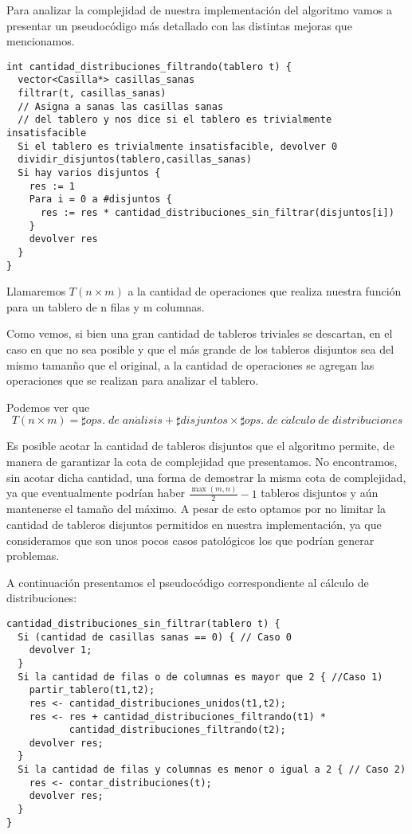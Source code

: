 \documentclass[a4paper, 12pt] {article}
\begin{document}
Para analizar la complejidad de nuestra implementaci\'on del algoritmo vamos a presentar un pseudoc\'odigo m\'as detallado con las distintas mejoras que mencionamos.


\begin{verbatim}
int cantidad_distribuciones_filtrando(tablero t) {
  vector<Casilla*> casillas_sanas
  filtrar(t, casillas_sanas)  
  // Asigna a sanas las casillas sanas 
  // del tablero y nos dice si el tablero es trivialmente insatisfacible
  Si el tablero es trivialmente insatisfacible, devolver 0
  dividir_disjuntos(tablero,casillas_sanas)
  Si hay varios disjuntos {
    res := 1
    Para i = 0 a #disjuntos {
      res := res * cantidad_distribuciones_sin_filtrar(disjuntos[i])
    }
    devolver res
  }
}
\end{verbatim}


Llamaremos $T\left( n \times m\right) $ a la cantidad de operaciones que realiza nuestra funci\'on para un tablero de n filas y m columnas.


Como vemos, si bien una gran cantidad de tableros triviales se descartan, en el caso en que no sea posible y que el m\'as grande de los tableros disjuntos sea del mismo taman\~no que el original, a la cantidad de operaciones se agregan las operaciones que se realizan para analizar el tablero.


Podemos ver que \begin{equation} \label{eq:op_total}
T\left( n \times m\right) = \sharp ops.\; de\; an\acute{a}lisis + \sharp disjuntos \times \sharp ops. \;de\; c\acute{a}lculo\; de\; distribuciones 
\end{equation}

Es posible acotar la cantidad de tableros disjuntos que el algoritmo permite, de manera de garantizar la cota de complejidad que presentamos. No encontramos, sin acotar dicha cantidad, una forma de demostrar la misma cota de complejidad, ya que eventualmente podr\'ian haber $\frac{\max\left( m,n\right) }{2} - 1$ tableros disjuntos y a\'un mantenerse el tama\~no del m\'aximo. A pesar de esto optamos por no limitar la cantidad de tableros disjuntos permitidos en nuestra implementaci\'on, ya que consideramos que son unos pocos casos patol\'ogicos los que podr\'ian generar problemas.


A continuaci\'on presentamos el pseudoc\'odigo correspondiente al c\'alculo de distribuciones:

\begin{verbatim}
cantidad_distribuciones_sin_filtrar(tablero t) {
  Si (cantidad de casillas sanas == 0) { // Caso 0
    devolver 1;
  }
  Si la cantidad de filas o de columnas es mayor que 2 { //Caso 1)
    partir_tablero(t1,t2);
    res <- cantidad_distribuciones_unidos(t1,t2);
    res <- res + cantidad_distribuciones_filtrando(t1) * 
           cantidad_distribuciones_filtrando(t2);
    devolver res;
  }
  Si la cantidad de filas y columnas es menor o igual a 2 { // Caso 2)
    res <- contar_distribuciones(t);
    devolver res;
  }
}
\end{verbatim}
\end{document}

